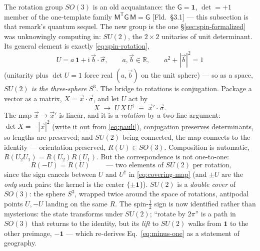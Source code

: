 \documentclass[11pt]{article}
\theoremstyle{plain}
\theoremstyle{definition}
\theoremstyle{remark}
\newcommand{\ii}{\mathrm{i}}
\newcommand{\R}{\mathbb{R}}
\newcommand{\vx}{\vec{x}}
\newcommand{\idop}{\mathbf{1}}  %
\begin{document}
The rotation group $SO(3)$ is an old acquaintance: the
$\mathsf G = \idop$, $\det = +1$ member of the one-template family
$\mathsf M^{\mathsf T}\mathsf G\,\mathsf M = \mathsf G$ [Fld.\
\S3.1] --- this subsection is that remark's quantum sequel. The new
group is the one \S\ref{sec:spin-formalized} was unknowingly
computing in: $SU(2)$, the $2\times2$ unitaries of unit
determinant. Its general element is exactly
\eqref{eq:spin-rotation},
\begin{equation}
  U = a\,\idop + \ii\,\vec b\cdot\vec\sigma,
  \qquad
  a, \vec b \in \R,
  \qquad
  a^2 + |\vec b|^2 = 1
  \label{eq:su2-param}
\end{equation}
(unitarity plus $\det U = 1$ force real $(a, \vec b)$ on the unit
sphere) --- so as a space, \emph{$SU(2)$ is the three-sphere}
$S^3$. The bridge to rotations is conjugation. Package a vector as
a matrix, $X = \vx\cdot\vec\sigma$, and let $U$ act by
\begin{equation}
  X \;\longrightarrow\; U\,X\,U^\dagger
  \;\equiv\; \vx'\cdot\vec\sigma .
  \label{eq:covering-map}
\end{equation}
The map $\vx \to \vx'$ is linear, and it is a \emph{rotation} by a
two-line argument: $\det X = -|\vx|^2$ (write it out from
\eqref{eq:pauli}), conjugation preserves determinants, so lengths
are preserved; and $SU(2)$ being connected, the map connects to the
identity --- orientation preserved, $R(U) \in SO(3)$. Composition
is automatic, $R(U_2 U_1) = R(U_2)R(U_1)$. But the correspondence
is not one-to-one:
\begin{equation}
  \boxed{\;
  R(-U) = R(U)
  \;}
  \qquad\text{--- two elements of } SU(2)
  \text{ per rotation,}
  \label{eq:two-to-one}
\end{equation}
since the sign cancels between $U$ and $U^\dagger$ in
\eqref{eq:covering-map} (and $\pm U$ are the \emph{only} such pairs:
the kernel is the center $\{\pm\idop\}$). $SU(2)$ is a
\emph{double cover} of $SO(3)$: the sphere $S^3$, wrapped twice
around the space of rotations, antipodal points $U, -U$ landing on
the same $R$. The spin-$\tfrac12$ sign is now identified rather
than mysterious: the state transforms under $SU(2)$; ``rotate by
$2\pi$'' is a path in $SO(3)$ that returns to the identity, but its
\emph{lift} to $SU(2)$ walks from $\idop$ to the other preimage,
$-\idop$ --- which re-derives Eq.~\eqref{eq:minus-one} as a
statement of geography.
\end{document}
